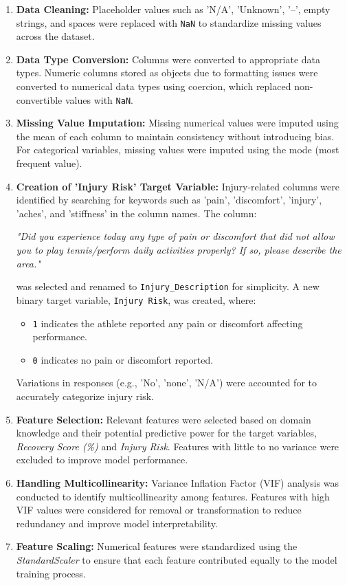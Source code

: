 \documentclass[manuscript,acmsmall,review,screen,authorversion=true]{acmart}
\begin{document}
\begin{enumerate}
    \item \textbf{Data Cleaning:} Placeholder values such as 'N/A', 'Unknown', '--', empty strings, and spaces were replaced with \texttt{NaN} to standardize missing values across the dataset.

    \item \textbf{Data Type Conversion:} Columns were converted to appropriate data types. Numeric columns stored as objects due to formatting issues were converted to numerical data types using coercion, which replaced non-convertible values with \texttt{NaN}.

    \item \textbf{Missing Value Imputation:} Missing numerical values were imputed using the mean of each column to maintain consistency without introducing bias. For categorical variables, missing values were imputed using the mode (most frequent value).

    \item \textbf{Creation of 'Injury Risk' Target Variable:} Injury-related columns were identified by searching for keywords such as 'pain', 'discomfort', 'injury', 'aches', and 'stiffness' in the column names. The column:

    \textit{"Did you experience today any type of pain or discomfort that did not allow you to play tennis/perform daily activities properly? If so, please describe the area."}

    was selected and renamed to \texttt{Injury\_Description} for simplicity. A new binary target variable, \texttt{Injury Risk}, was created, where:

    \begin{itemize}
        \item \texttt{1} indicates the athlete reported any pain or discomfort affecting performance.
        \item \texttt{0} indicates no pain or discomfort reported.
    \end{itemize}

    Variations in responses (e.g., 'No', 'none', 'N/A') were accounted for to accurately categorize injury risk.

    \item \textbf{Feature Selection:} Relevant features were selected based on domain knowledge and their potential predictive power for the target variables, \textit{Recovery Score (\%)} and \textit{Injury Risk}. Features with little to no variance were excluded to improve model performance.

    \item \textbf{Handling Multicollinearity:} Variance Inflation Factor (VIF) analysis was conducted to identify multicollinearity among features. Features with high VIF values were considered for removal or transformation to reduce redundancy and improve model interpretability.

    \item \textbf{Feature Scaling:} Numerical features were standardized using the \textit{StandardScaler} to ensure that each feature contributed equally to the model training process.
\end{enumerate}
\end{document}
